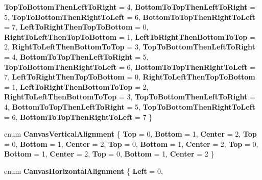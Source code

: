 \begin{DoxyCompactItemize}
\newline
{\bfseries Top\+To\+Bottom\+Then\+Left\+To\+Right} = 4, 
{\bfseries Bottom\+To\+Top\+Then\+Left\+To\+Right} = 5, 
{\bfseries Top\+To\+Bottom\+Then\+Right\+To\+Left} = 6, 
{\bfseries Bottom\+To\+Top\+Then\+Right\+To\+Left} = 7, 
\newline
{\bfseries Left\+To\+Right\+Then\+Top\+To\+Bottom} = 0, 
{\bfseries Right\+To\+Left\+Then\+Top\+To\+Bottom} = 1, 
{\bfseries Left\+To\+Right\+Then\+Bottom\+To\+Top} = 2, 
{\bfseries Right\+To\+Left\+Then\+Bottom\+To\+Top} = 3, 
\newline
{\bfseries Top\+To\+Bottom\+Then\+Left\+To\+Right} = 4, 
{\bfseries Bottom\+To\+Top\+Then\+Left\+To\+Right} = 5, 
{\bfseries Top\+To\+Bottom\+Then\+Right\+To\+Left} = 6, 
{\bfseries Bottom\+To\+Top\+Then\+Right\+To\+Left} = 7, 
\newline
{\bfseries Left\+To\+Right\+Then\+Top\+To\+Bottom} = 0, 
{\bfseries Right\+To\+Left\+Then\+Top\+To\+Bottom} = 1, 
{\bfseries Left\+To\+Right\+Then\+Bottom\+To\+Top} = 2, 
{\bfseries Right\+To\+Left\+Then\+Bottom\+To\+Top} = 3, 
\newline
{\bfseries Top\+To\+Bottom\+Then\+Left\+To\+Right} = 4, 
{\bfseries Bottom\+To\+Top\+Then\+Left\+To\+Right} = 5, 
{\bfseries Top\+To\+Bottom\+Then\+Right\+To\+Left} = 6, 
{\bfseries Bottom\+To\+Top\+Then\+Right\+To\+Left} = 7
 \}
\item 
\mbox{\label{namespace_microsoft_1_1_graphics_1_1_canvas_1_1_text_a152840fdbab49a06690e74695359e3fd}} 
enum {\bfseries Canvas\+Vertical\+Alignment} \{ \newline
{\bfseries Top} = 0, 
{\bfseries Bottom} = 1, 
{\bfseries Center} = 2, 
{\bfseries Top} = 0, 
\newline
{\bfseries Bottom} = 1, 
{\bfseries Center} = 2, 
{\bfseries Top} = 0, 
{\bfseries Bottom} = 1, 
\newline
{\bfseries Center} = 2, 
{\bfseries Top} = 0, 
{\bfseries Bottom} = 1, 
{\bfseries Center} = 2, 
\newline
{\bfseries Top} = 0, 
{\bfseries Bottom} = 1, 
{\bfseries Center} = 2
 \}
\item 
\mbox{\label{namespace_microsoft_1_1_graphics_1_1_canvas_1_1_text_afbe7037cb35da011cc144d6cb2d328f5}} 
enum {\bfseries Canvas\+Horizontal\+Alignment} \{ \newline
{\bfseries Left} = 0, 

\end{DoxyCompactItemize}
